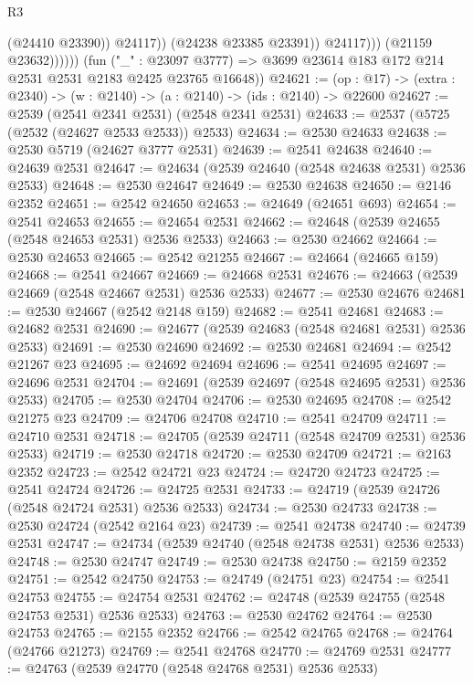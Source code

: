 \begin{lexlean}{R3}
\begin{coremodule}
                              (@24410 @23390))
                            @24117))
                        (@24238 @23385 @23391))
                      @24117)))
                (@21159 @23632))))))
      (fun ("_" : @23097 @3777) =>
      @3699 @23614 @183 @172 @214 @2531 @2531 @2183 @2425 @23765 @16648))
@24621 := (op : @17) -> (extra : @2340) -> (w : @2140) -> (a : @2140) -> (ids : @2140) -> @22600
@24627 := @2539 (@2541 @2341 @2531) (@2548 @2341 @2531)
@24633 := @2537 (@5725 (@2532 (@24627 @2533 @2533)) @2533)
@24634 := @2530 @24633
@24638 := @2530 @5719 (@24627 @3777 @2531)
@24639 := @2541 @24638
@24640 := @24639 @2531
@24647 := @24634 (@2539 @24640 (@2548 @24638 @2531) @2536 @2533)
@24648 := @2530 @24647
@24649 := @2530 @24638
@24650 := @2146 @2352
@24651 := @2542 @24650
@24653 := @24649 (@24651 @693)
@24654 := @2541 @24653
@24655 := @24654 @2531
@24662 := @24648 (@2539 @24655 (@2548 @24653 @2531) @2536 @2533)
@24663 := @2530 @24662
@24664 := @2530 @24653
@24665 := @2542 @21255
@24667 := @24664 (@24665 @159)
@24668 := @2541 @24667
@24669 := @24668 @2531
@24676 := @24663 (@2539 @24669 (@2548 @24667 @2531) @2536 @2533)
@24677 := @2530 @24676
@24681 := @2530 @24667 (@2542 @2148 @159)
@24682 := @2541 @24681
@24683 := @24682 @2531
@24690 := @24677 (@2539 @24683 (@2548 @24681 @2531) @2536 @2533)
@24691 := @2530 @24690
@24692 := @2530 @24681
@24694 := @2542 @21267 @23
@24695 := @24692 @24694
@24696 := @2541 @24695
@24697 := @24696 @2531
@24704 := @24691 (@2539 @24697 (@2548 @24695 @2531) @2536 @2533)
@24705 := @2530 @24704
@24706 := @2530 @24695
@24708 := @2542 @21275 @23
@24709 := @24706 @24708
@24710 := @2541 @24709
@24711 := @24710 @2531
@24718 := @24705 (@2539 @24711 (@2548 @24709 @2531) @2536 @2533)
@24719 := @2530 @24718
@24720 := @2530 @24709
@24721 := @2163 @2352
@24723 := @2542 @24721 @23
@24724 := @24720 @24723
@24725 := @2541 @24724
@24726 := @24725 @2531
@24733 := @24719 (@2539 @24726 (@2548 @24724 @2531) @2536 @2533)
@24734 := @2530 @24733
@24738 := @2530 @24724 (@2542 @2164 @23)
@24739 := @2541 @24738
@24740 := @24739 @2531
@24747 := @24734 (@2539 @24740 (@2548 @24738 @2531) @2536 @2533)
@24748 := @2530 @24747
@24749 := @2530 @24738
@24750 := @2159 @2352
@24751 := @2542 @24750
@24753 := @24749 (@24751 @23)
@24754 := @2541 @24753
@24755 := @24754 @2531
@24762 := @24748 (@2539 @24755 (@2548 @24753 @2531) @2536 @2533)
@24763 := @2530 @24762
@24764 := @2530 @24753
@24765 := @2155 @2352
@24766 := @2542 @24765
@24768 := @24764 (@24766 @21273)
@24769 := @2541 @24768
@24770 := @24769 @2531
@24777 := @24763 (@2539 @24770 (@2548 @24768 @2531) @2536 @2533)

\end{coremodule}
\end{lexlean}
